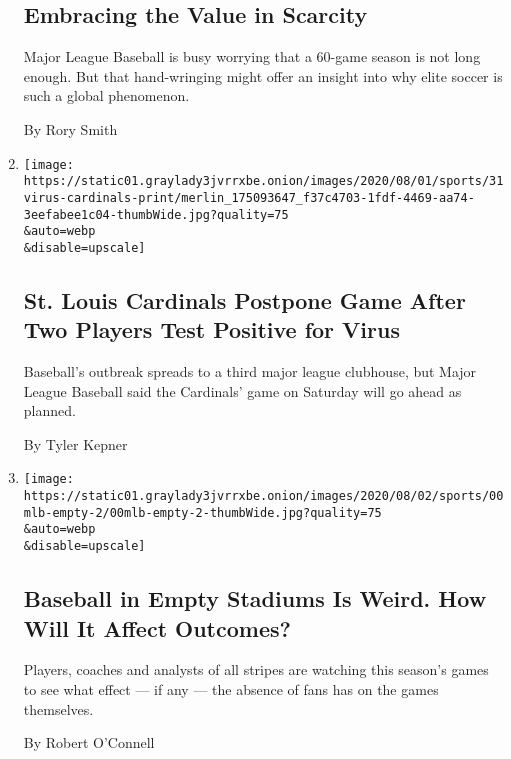 \begin{enumerate}
  \hypertarget{embracing-the-value-in-scarcity}{%
  \subsection{Embracing the Value in
  Scarcity}\label{embracing-the-value-in-scarcity}}

  Major League Baseball is busy worrying that a 60-game season is not
  long enough. But that hand-wringing might offer an insight into why
  elite soccer is such a global phenomenon.

  By Rory Smith
\item
  \href{/2020/07/31/sports/baseball/cardinals-twins-coronavirus-mlb.html}{}

  \texttt{[image: https://static01.graylady3jvrrxbe.onion/images/2020/08/01/sports/31virus-cardinals-print/merlin\_175093647\_f37c4703-1fdf-4469-aa74-3eefabee1c04-thumbWide.jpg?quality=75\\\&auto=webp\\\&disable=upscale]}

  \hypertarget{st-louis-cardinals-postpone-game-after-two-players-test-positive-for-virus}{%
  \subsection{St. Louis Cardinals Postpone Game After Two Players Test
  Positive for
  Virus}\label{st-louis-cardinals-postpone-game-after-two-players-test-positive-for-virus}}

  Baseball's outbreak spreads to a third major league clubhouse, but
  Major League Baseball said the Cardinals' game on Saturday will go
  ahead as planned.

  By Tyler Kepner
\item
  \href{/2020/07/31/sports/baseball/baseball-empty-stadiums-effects.html}{}

  \texttt{[image: https://static01.graylady3jvrrxbe.onion/images/2020/08/02/sports/00mlb-empty-2/00mlb-empty-2-thumbWide.jpg?quality=75\\\&auto=webp\\\&disable=upscale]}

  \hypertarget{baseball-in-empty-stadiums-is-weird-how-will-it-affect-outcomes}{%
  \subsection{Baseball in Empty Stadiums Is Weird. How Will It Affect
  Outcomes?}\label{baseball-in-empty-stadiums-is-weird-how-will-it-affect-outcomes}}

  Players, coaches and analysts of all stripes are watching this
  season's games to see what effect --- if any --- the absence of fans
  has on the games themselves.

  By Robert O'Connell
\end{enumerate}

